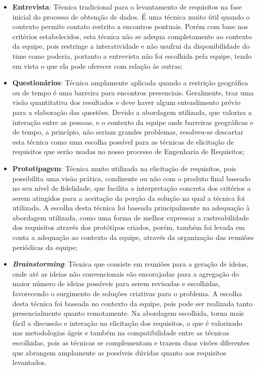 		\begin{itemize}
			\item{\textbf{Entrevista}: Técnica tradicional para o levantamento de requisitos na fase inicial do processo de obtenção de dados. É uma técnica muito útil quando o contexto permite contato restrito a encontros pontuais. Porém com base nos critérios estabelecidos, esta técnica não se adequa completamente ao contexto da equipe, pois restringe a interatividade e não usufrui da disponibilidade do time como poderia, portanto a entrevista não foi escolhida pela equipe, tendo em vista o que ela pode oferecer com relação às outras;}
			\item{\textbf{Questionários}: Técnica amplamente aplicada quando a restrição geográfica ou de tempo é uma barreira para encontros presenciais. Geralmente, traz uma visão quantitativa dos resultados e deve haver algum entendimento prévio para a elaboração das questões. Devido a abordagem utilizada, que valoriza a interação entre as pessoas, e o contexto da equipe onde barreiras geográficas e de tempo, a princípio, não seriam grandes problemas, resolveu-se descartar esta técnica como uma escolha possível para as técnicas de elicitação de requisitos que serão usadas no nosso processo de Engenharia de Requisitos;}
			\item{\textbf{Prototipagem}: Técnica muito utilizada na elicitação de requisitos, pois possibilita uma visão prática, condizente ou não com o produto final baseado no seu nível de fidelidade, que facilita a interpretação concreta dos critérios a serem atingidos para a aceitação da porção da solução na qual a técnica foi utilizada. A escolha desta técnica foi baseada principalmente na adequação à abordagem utilizada, como uma forma de melhor expressar a rastreabilidade dos requisitos através dos protótipos criados, porém, também foi levada em conta a adequação ao contexto da equipe, através da organização das reuniões periódicas da equipe;}
			\item{\textbf{\emph{Brainstorming}}: Técnica que consiste em reuniões para a geração de ideias, onde até as ideias não convencionais são encorajadas para a agregação do maior número de ideias possíveis para serem revisadas e escolhidas, favorecendo o surgimento de soluções criativas para o problema. A escolha desta técnica foi baseada no contexto da equipe, pois pode ser realizada tanto presencialmente quanto remotamente. Na abordagem escolhida, torna mais fácil a discussão e interação na elicitação dos requisitos, o que é valorizado nas metodologias ágeis e também na compatibilidade entre as técnicas escolhidas, pois as técnicas se complementam e trazem duas visões diferentes que abrangem amplamente as possíveis dúvidas quanto aos requisitos levantados.}
		\end{itemize}